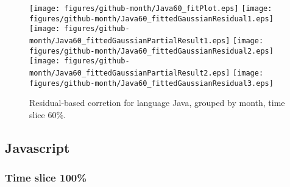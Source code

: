 \begin{figure}[hb]
\centering
{}
{\texttt{[image: figures/github-month/Java60\_fitPlot.eps]}}
{\texttt{[image: figures/github-month/Java60\_fittedGaussianResidual1.eps]}}
{\texttt{[image: figures/github-month/Java60\_fittedGaussianPartialResult1.eps]}}
{\texttt{[image: figures/github-month/Java60\_fittedGaussianResidual2.eps]}}
{\texttt{[image: figures/github-month/Java60\_fittedGaussianPartialResult2.eps]}}
{\texttt{[image: figures/github-month/Java60\_fittedGaussianResidual3.eps]}}
\caption{Residual-based corretion for language Java, grouped by month, time slice 60\%.}
\end{figure}


\clearpage 
\newpage 


\subsection{Javascript}

\FloatBarrier

\subsubsection{Time slice 100\%}

